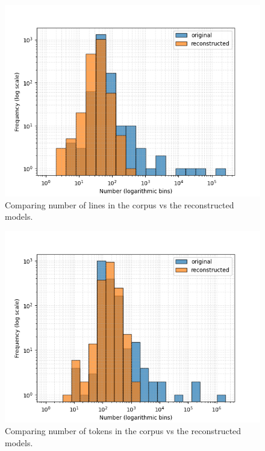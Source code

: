 \begin{figure}[htbp]
\centerline{\includegraphics[width=\linewidth]{"./Comparing number of lines in the corpus vs the reconstructed models.png"}}
\caption{Comparing number of lines in the corpus vs the reconstructed models.}
\label{fig}
\end{figure}


\begin{figure}[htbp]
\centerline{\includegraphics[width=\linewidth]{"./Comparing number of tokens in the corpus vs the reconstructed models.png"}}
\caption{Comparing number of tokens in the corpus vs the reconstructed models.}
\label{fig}
\end{figure}


